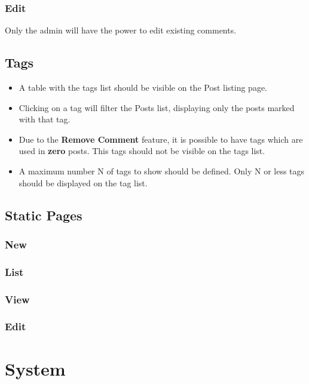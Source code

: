 \documentclass[english]{article}%
\begin{document}
\subsubsection{Edit}
Only the admin will have the power to edit existing comments.

\subsection{Tags}
\begin{itemize}
\item A table with the tags list should be visible on the Post listing page.
\item Clicking on a tag will filter the Posts list, displaying only the posts marked with that tag.
\item Due to the \textbf{Remove Comment} feature, it is possible to have tags which are used in \textbf{zero} posts. This tags should not be visible on the tags list.
\item A maximum number N of tags to show should be defined. Only N or less tags should be displayed on the tag list.
\end{itemize}

\subsection{Static Pages}
\subsubsection{New}
\subsubsection{List}
\subsubsection{View}
\subsubsection{Edit}

\section{System}
\end{document}
